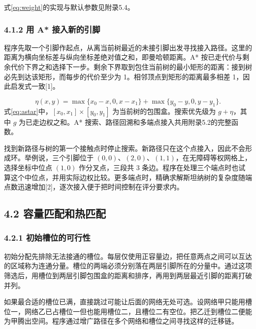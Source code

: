 \documentclass[12pt,a4paper]{article}
\begin{document}
式\eqref{eq:weight}的实现与默认参数见附录5.4。

\subsubsection{4.1.2 用 A*
接入新的引脚}\label{ux7528-a-ux63a5ux5165ux65b0ux7684ux5f15ux811a}

程序先取一个引脚作起点，从离当前树最近的未接引脚出发寻找接入路径。这里的距离为横向坐标差与纵向坐标差绝对值之和，即曼哈顿距离。A*
按已走代价与剩余代价下界之和选择下一步。剩余下界取到包住当前树的最小矩形的距离：接到树必先到达该矩形，而每步的代价至少为
1。相邻顶点到矩形的距离最多相差 1，因此启发式一致{[}1{]}。

\begin{equation}
\eta(x,y)=\max\{x_0-x,0,x-x_1\}+\max\{y_0-y,0,y-y_1\}.
\label{eq:astar}
\end{equation}
式\eqref{eq:astar}中，$[x_0,x_1]\times[y_0,y_1]$ 为当前树的包围盒。搜索优先级为 $g+\eta$，其中 $g$ 为已走边权之和。A* 搜索、路径回溯和多端点接入共用附录5.2的完整函数。

找到新路径与树的第一个接触点时停止搜索。新路径只在这个点接入，因此不会形成环。举例说，三个引脚位于
\((0,0)\)、\((2,0)\)、\((1,1)\)，在无障碍等权网格上，选择坐标中位点 \((1,0)\)
作分叉点，三段共 3
条边。程序在处理三个端点时也试算这个中位点，并用实际边权比较。更多端点时，精确求解斯坦纳树的复杂度随端点数迅速增加{[}2{]}，逐次接入便于把时间控制在评分要求内。

\subsection{4.2
容量匹配和热匹配}\label{ux5bb9ux91cfux5339ux914dux548cux70edux5339ux914d}

\subsubsection{4.2.1
初始槽位的可行性}\label{ux521dux59cbux69fdux4f4dux7684ux53efux884cux6027}

初始分配先排除无法接通的槽位。每层仅使用正容量边，把任意两点之间可以互达的区域称为连通分量。槽位的两端必须分别落在两层引脚所在的分量中。通过这项筛选后，用槽位到两层引脚包围盒的距离和排序，再用到两层最近引脚的距离打破并列。

如果最合适的槽位已满，直接跳过可能让后面的网络无处可选。设网络甲只能用槽位一，网络乙已占槽位一但也能用槽位二，且槽位二有空位。把乙迁到槽位二便能为甲腾出空间。程序通过增广路径在多个网络和槽位之间寻找这样的迁移链。
\end{document}
